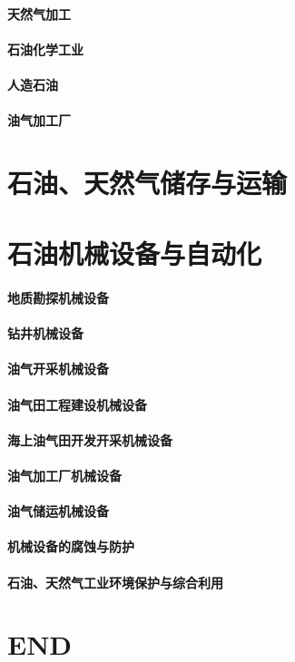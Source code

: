 \documentclass[UTF8]{../../ApplicationUniverse}
\begin{document}
\subsubsection{天然气加工}
\subsubsection{石油化学工业}
\subsubsection{人造石油}
\subsubsection{油气加工厂}




\chapter{石油、天然气储存与运输}





\chapter{石油机械设备与自动化}
\subsubsection{地质勘探机械设备}
\subsubsection{钻井机械设备}
\subsubsection{油气开采机械设备}
\subsubsection{油气田工程建设机械设备}
\subsubsection{海上油气田开发开采机械设备}
\subsubsection{油气加工厂机械设备}
\subsubsection{油气储运机械设备}
\subsubsection{机械设备的腐蚀与防护}
\subsubsection{石油、天然气工业环境保护与综合利用}



\chapter{END}
\end{document}
